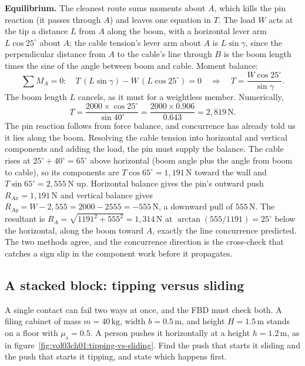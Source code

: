 \textbf{Equilibrium.} The cleanest route sums moments about $A$, which
kills the pin reaction (it passes through $A$) and leaves one equation in
$T$. The load $W$ acts at the tip a distance $L$ from $A$ along the boom,
with a horizontal lever arm $L\cos 25^{\circ}$ about $A$; the cable
tension's lever arm about $A$ is $L\sin\gamma$, since the perpendicular
distance from $A$ to the cable's line through $B$ is the boom length times
the sine of the angle between boom and cable. Moment balance:
\[
\sum M_A = 0: \quad T\,(L\sin\gamma) - W\,(L\cos 25^{\circ}) = 0
\quad\Longrightarrow\quad
T = \frac{W\cos 25^{\circ}}{\sin\gamma}.
\]
The boom length $L$ cancels, as it must for a weightless member. Numerically,
\[
T = \frac{2000 \times \cos 25^{\circ}}{\sin 40^{\circ}}
= \frac{2000 \times 0.906}{0.643} = 2{,}819\,\text{N}.
\]
The pin reaction follows from force balance, and concurrence has already
told us it lies along the boom. Resolving the cable tension into horizontal
and vertical components and adding the load, the pin must supply the balance.
The cable rises at $25^{\circ} + 40^{\circ} = 65^{\circ}$ above horizontal
(boom angle plus the angle from boom to cable), so its components are
$T\cos 65^{\circ} = 1{,}191\,\text{N}$ toward the wall and $T\sin 65^{\circ}
= 2{,}555\,\text{N}$ up. Horizontal balance gives the pin's outward push
$R_{Ax} = 1{,}191\,\text{N}$ and vertical balance gives $R_{Ay} = W -
2{,}555 = 2000 - 2555 = -555\,\text{N}$, a downward pull of $555\,\text{N}$.
The resultant is $R_A = \sqrt{1191^2 + 555^2} = 1{,}314\,\text{N}$ at
$\arctan(555/1191) = 25^{\circ}$ below the horizontal, along the boom toward
$A$, exactly the line concurrence predicted. The two methods agree, and the
concurrence direction is the cross-check that catches a sign slip in the
component work before it propagates.

\subsection{A stacked block: tipping versus sliding}



A single contact can fail two ways at once, and the FBD must check both. A
filing cabinet of mass $m = 40\,\si{\kilogram}$, width $b = 0.5\,\si{\meter}$,
and height $H = 1.5\,\si{\meter}$ stands on a floor with $\mu_s = 0.5$. A
person pushes it horizontally at a height $h = 1.2\,\si{\meter}$, as in
figure~\ref{fig:vol03ch01:tipping-vs-sliding}. Find the push that starts it
sliding and the push that starts it tipping, and state which happens first.


